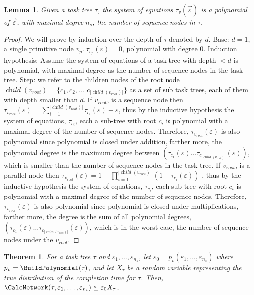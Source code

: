 \documentclass{article}
\newtheorem{theorem}{Theorem}
\newtheorem{lemma}{Lemma}
\DeclareMathOperator{\ch}{\textit{child}}
\begin{document}
\begin{lemma}\label{lemma:poly}
Given a task tree $\tau$, the system of equations $ \tau_v(\overrightarrow{\varepsilon}) $ is a polynomial of $\overrightarrow{\varepsilon}$, with maximal degree ${n_s}$, the number of sequence nodes in $\tau$.  
\end{lemma}
\begin{proof}
We will prove by induction over the depth of $\tau$ denoted by $d$. Base: $ d=1$, a single primitive node $ v_p $. $\tau_{v_p}(\varepsilon)=0$, polynomial with degree 0.
Induction hypothesis: Assume the system of equations of a task tree with depth $ <d $ is polynomial, with maximal degree as the number of sequence nodes in the task tree. Step: we refer to the children nodes of the root node $\ch(v_{root})= \lbrace c_1, c_2,...,c_{|\ch(v_{root})|}\rbrace$ as a set of sub task trees, each of them with depth smaller than $ d $. If $v_{root}$, is a sequence node then $\tau_{v_{root}}(\varepsilon)=\sum_{i=1}^{|\ch(v_{root})|}\tau_{c_i}(\varepsilon) +  \varepsilon$, thus by the inductive hypothesis the system of equations, $ \tau_{c_i} $, each a sub-tree with root $ c_i $ is polynomial with a maximal degree of the number of sequence nodes. Therefore, $\tau_{v_{root}}(\varepsilon)$ is also polynomial since polynomial is closed under addition, farther more, the polynomial degree is the maximum degree between $\left( \tau_{c_1}(\varepsilon) \dots \tau_{c_{|\ch(v_{root})|}}(\varepsilon)\right)$, which is smaller than the number of sequence nodes in the task-tree. If $v_{root}$, is a parallel node then $\tau_{v_{root}}(\varepsilon)=1-\prod_{i=1}^{|\ch(v_{root})|} (1-\tau_{c_i}(\varepsilon))$ , thus by the inductive hypothesis the system of equations, $ \tau_{c_i} $, each sub-tree with root $ c_i $ is polynomial with a maximal degree of the number of sequence nodes. Therefore, $\tau_{v_{root}}(\varepsilon)$ is also polynomial since polynomial is closed under multiplications, farther more, the degree is the sum of all polynomial degrees, $\left( \tau_{c_1}(\varepsilon) \dots \tau_{c_{|\ch(v_{root})|}}(\varepsilon)\right)$, which is in the worst case, the number of sequence nodes under the $v_{root}$. 
\end{proof}

\begin{theorem}\label{theorem:approxEps0}
For a task tree $\tau$ and $\varepsilon_1, \dots, \varepsilon_{n_s}$, let 
$\varepsilon_0=p_v(\varepsilon_1, \dots, \varepsilon_{n_s}) $ where $p_v=\BuildPolynomial(\tau)$, 
and let $X_{\tau}$ be a random variable representing the true
distribution of the completion time for $\tau$. Then,
$\CalcNetwork(\tau, \varepsilon_1, \dots, \varepsilon_{n_s}) \succeq{\varepsilon_0} X_{\tau}$.
\end{theorem}
\end{document}
